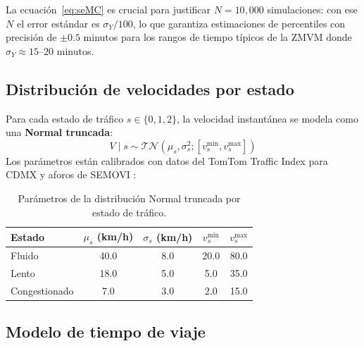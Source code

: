 \documentclass[11pt,a4paper]{article}
\begin{document}
La ecuación~\eqref{eq:seMC} es crucial para justificar $N=10{,}000$ simulaciones: con ese $N$ el error estándar es $\sigma_Y/100$, lo que garantiza estimaciones de percentiles con precisión de $\pm 0.5$ minutos para los rangos de tiempo típicos de la ZMVM donde $\sigma_Y \approx 15$--$20$ minutos.

\subsection{Distribución de velocidades por estado}

Para cada estado de tráfico $s \in \{0, 1, 2\}$, la velocidad instantánea se modela como una \textbf{Normal truncada}:
\begin{equation}
V \mid s \sim \mathcal{TN}\left(\mu_s, \sigma_s^2; [v_s^\text{min}, v_s^\text{max}]\right)
\label{eq:tn}
\end{equation}
Los parámetros están calibrados con datos del TomTom Traffic Index para CDMX y aforos de SEMOVI \cite{semovi2023}:

\begin{table}[H]
\centering
\small
\begin{tabular}{@{}lcccc@{}}
\toprule
\textbf{Estado} & $\mu_s$ (km/h) & $\sigma_s$ (km/h) & $v_s^\text{min}$ & $v_s^\text{max}$ \\
\midrule
Fluido & 40.0 & 8.0 & 20.0 & 80.0 \\
Lento & 18.0 & 5.0 & 5.0 & 35.0 \\
Congestionado & 7.0 & 3.0 & 2.0 & 15.0 \\
\bottomrule
\end{tabular}
\caption{Parámetros de la distribución Normal truncada por estado de tráfico.}
\label{tab:velocidades}
\end{table}

\subsection{Modelo de tiempo de viaje}
\end{document}
